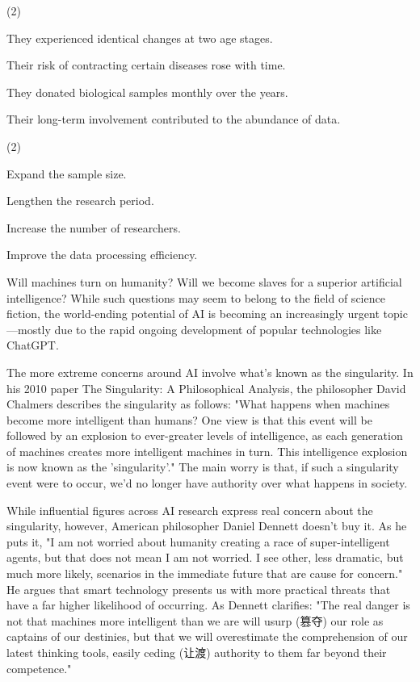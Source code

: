 \documentclass{英语试卷}
\begin{document}
\begin{choices}(2)
  \item They experienced identical changes at two age stages.
  \item Their risk of contracting certain diseases rose with time.
  \item They donated biological samples monthly over the years.
  \item Their long-term involvement contributed to the abundance of data.
\end{choices}
\begin{choices}(2)
  \item Expand the sample size.
  \item Lengthen the research period.
  \item Increase the number of researchers.
  \item Improve the data processing efficiency.
\end{choices}
\par Will machines turn on humanity? Will we become slaves for a superior artificial intelligence? While such questions may seem to belong to the field of science fiction, the world-ending potential of AI is becoming an increasingly urgent topic—mostly due to the rapid ongoing development of popular technologies like ChatGPT.\par
\par The more extreme concerns around AI involve what's known as the singularity. In his 2010 paper The Singularity: A Philosophical Analysis, the philosopher David Chalmers describes the singularity as follows: "What happens when machines become more intelligent than humans? One view is that this event will be followed by an explosion to ever-greater levels of intelligence, as each generation of machines creates more intelligent machines in turn. This intelligence explosion is now known as the 'singularity'." The main worry is that, if such a singularity event were to occur, we'd no longer have authority over what happens in society.\par
\par While influential figures across AI research express real concern about the singularity, however, American philosopher Daniel Dennett doesn't buy it. As he puts it, "I am not worried about humanity creating a race of super-intelligent agents, but that does not mean I am not worried. I see other, less dramatic, but much more likely, scenarios in the immediate future that are cause for concern." He argues that smart technology presents us with more practical threats that have a far higher likelihood of occurring. As Dennett clarifies: "The real danger is not that machines more intelligent than we are will usurp (篡夺) our role as captains of our destinies, but that we will overestimate the comprehension of our latest thinking tools, easily ceding (让渡) authority to them far beyond their competence."\par
\end{document}
